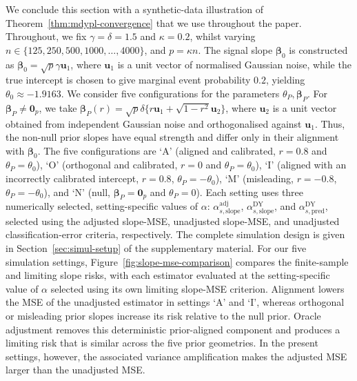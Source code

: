 \documentclass{article}
\theoremstyle{definition}
\newcommand*{\bb}{\boldsymbol}
\def\bu{\bb{u}}
\def\bbeta{\bb{\beta}}
\begin{document}
\begin{bibunit}
We conclude this section with a synthetic-data illustration of
Theorem~\ref{thm:mdypl-convergence} that we use throughout the paper. 
Throughout, we fix $\gamma = \delta = 1.5$ and $\kappa = 0.2$, whilst varying
$
    n\in
    \{125,250,500,1000,\ldots,4000\}
$, and 
$p=\kappa n$.
The signal slope $\bbeta_0$ is constructed as
$\bbeta_0=\sqrt p \gamma\bu_1$, where $\bu_1$ is a unit vector of normalised
Gaussian noise, while the true intercept is chosen to give marginal event
probability $0.2$, yielding $\theta_0\approx-1.9163$.
We consider five configurations for the parameters $\theta_P, \bbeta_P$.
For $\bbeta_P \neq \bb 0_p$, we take 
$
    \bbeta_P(r)
    =
    \sqrt p \delta
   \{
        r\bu_1+\sqrt{1-r^2}\bu_2
    \}$,
where $\bu_2$ is a unit vector obtained from independent Gaussian noise and
orthogonalised against $\bu_1$.
Thus, the non-null prior slopes
have equal strength and differ only in their alignment with $\bbeta_0$.
The five configurations are `$\mathrm A$' (aligned and calibrated,
$r=0.8$ and $\theta_P=\theta_0$), `$\mathrm O$' (orthogonal and calibrated,
$r=0$ and $\theta_P=\theta_0$), `$\mathrm I$' (aligned with an incorrectly
calibrated intercept, $r=0.8$, $\theta_P=-\theta_0$), `$\mathrm M$' (misleading, $r=-0.8$, $\theta_P=-\theta_0$), and
`$\mathrm N$' (null, $\bbeta_P=\bb0_p$ and $\theta_P=0$). 
Each setting uses three numerically selected, setting-specific values of
$\alpha$: $\alpha_{s,\mathrm{slope}}^{\mathrm{adj}}$,
$\alpha_{s,\mathrm{slope}}^{\mathrm{DY}}$, and
$\alpha_{s,\mathrm{pred}}^{\mathrm{DY}}$, selected using the adjusted
slope-MSE, unadjusted slope-MSE, and unadjusted classification-error
criteria, respectively.
The complete simulation design is
given in Section~\ref{sec:simul-setup} of the supplementary material.
For our five simulation settings,
Figure~\ref{fig:slope-mse-comparison} compares the finite-sample and limiting
slope risks, with each estimator evaluated at the setting-specific value of $\alpha$
selected using its own limiting slope-MSE criterion.
Alignment lowers the MSE of the unadjusted estimator in settings `$\mathrm{A}$'
and `$\mathrm{I}$', whereas orthogonal or misleading prior slopes increase its
risk relative to the null prior. Oracle adjustment removes this deterministic
prior-aligned component and produces a limiting risk that is similar across
the five prior geometries. In the present settings, however, the associated
variance amplification makes the adjusted MSE larger than the unadjusted MSE.



\end{bibunit}
\end{document}
